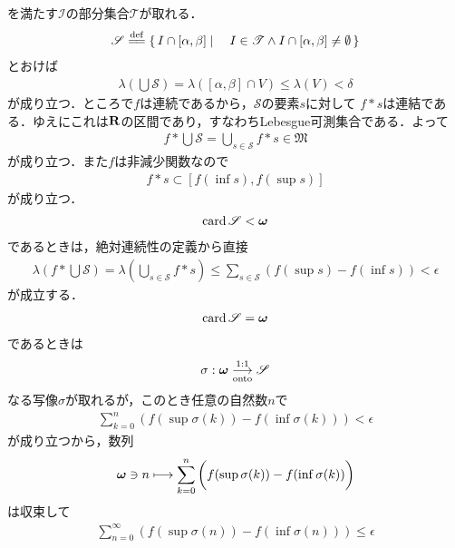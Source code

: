 \begin{sketch}
		を満たす$\mathscr{I}$の部分集合$\mathscr{T}$が取れる．
		\begin{align}
			\mathscr{S} \defeq \Set{I \cap [\alpha,\beta]}{I \in \mathscr{T} \wedge I \cap [\alpha,\beta] \neq \emptyset}
		\end{align}
		とおけば
		\begin{align}
			\lambda\left(\bigcup \mathscr{S}\right)
			= \lambda\left([\alpha,\beta] \cap V\right) \leq \lambda(V) < \delta
		\end{align}
		が成り立つ．ところで$f$は連続であるから，$\mathscr{S}$の要素$s$に対して
		$f \ast s$は連結である．ゆえにこれは$\mathbf{R}$の区間であり，すなわちLebesgue可測集合である．よって
		\begin{align}
			f \ast \bigcup \mathscr{S} = \bigcup_{s \in \mathscr{S}} f \ast s \in \mathfrak{M}
		\end{align}
		が成り立つ．また$f$は非減少関数なので
		\begin{align}
			f \ast s \subset [f(\inf{}{s}),f(\sup{}{s})]
		\end{align}
		が成り立つ．
		\begin{align}
			\operatorname{card} \mathscr{S} < {\boldsymbol \omega}
		\end{align}
		であるときは，絶対連続性の定義から直接
		\begin{align}
			\lambda\left(f \ast \bigcup \mathscr{S}\right)
			= \lambda\left(\bigcup_{s \in \mathscr{S}} f \ast s\right)
			\leq \sum_{s \in \mathscr{S}} \left(f(\sup{}{s}) - f(\inf{}{s})\right)
			< \epsilon
		\end{align}
		が成立する．
		\begin{align}
			\operatorname{card} \mathscr{S} = {\boldsymbol \omega}
		\end{align}
		であるときは
		\begin{align}
			\sigma:{\boldsymbol \omega} \underset{\mathrm{onto}}{\overset{\mathrm{1:1}}{\longrightarrow}} \mathscr{S}
		\end{align}
		なる写像$\sigma$が取れるが，このとき任意の自然数$n$で
		\begin{align}
			\sum_{k=0}^{n} \left(f(\sup{}{\sigma(k)}) - f(\inf{}{\sigma(k)})\right)
			< \epsilon
		\end{align}
		が成り立つから，数列
		\begin{align}
			{\boldsymbol \omega} \ni n \longmapsto 
			\sum_{k=0}^{n} \left(f(\operatorname*{sup}_{} \sigma(k)) - f(\operatorname*{inf}_{} \sigma(k))\right)
		\end{align}
		は収束して
		\begin{align}
			\sum_{n=0}^{\infty} \left(f(\sup{}{\sigma(n)}) - f(\inf{}{\sigma(n)})\right)
			\leq \epsilon
		\end{align}

\end{sketch}

